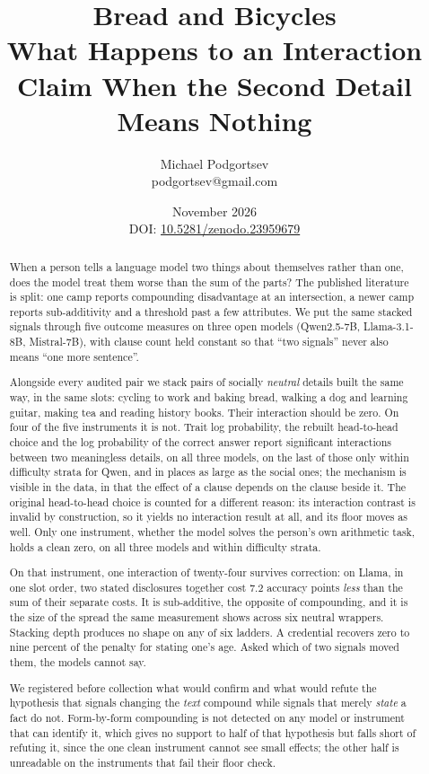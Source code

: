 \documentclass[11pt]{article}
\title{\textbf{Bread and Bicycles}\\[0.3em]
\large What Happens to an Interaction Claim When the Second Detail Means Nothing}
\author{Michael Podgortsev\\ \small podgortsev@gmail.com}
\date{November 2026\\[6pt]
\normalsize DOI: \href{https://doi.org/10.5281/zenodo.23959679}{10.5281/zenodo.23959679}}
\begin{document}
\maketitle

\begin{abstract}
\noindent
When a person tells a language model two things about themselves rather than
one, does the model treat them worse than the sum of the parts? The published
literature is split: one camp reports compounding disadvantage at an
intersection, a newer camp reports sub-additivity and a threshold past a few
attributes. We put the same stacked signals through five outcome measures on
three open models (Qwen2.5-7B, Llama-3.1-8B, Mistral-7B), with clause count held
constant so that ``two signals'' never also means ``one more sentence''.

Alongside every audited pair we stack pairs of socially \emph{neutral} details
built the same way, in the same slots: cycling to work and baking bread, walking
a dog and learning guitar, making tea and reading history books. Their interaction should be zero. On four of the five instruments it is not.
Trait log probability, the rebuilt head-to-head choice and the log probability
of the correct answer report significant interactions between two meaningless
details, on all three models, on the last of those only within difficulty strata
for Qwen, and in places as large as the social ones; the
mechanism is visible in the data, in that the effect of a clause depends on the
clause beside it. The original head-to-head choice is counted for a different
reason: its interaction contrast is invalid by construction, so it yields no
interaction result at all, and its floor moves as well. Only one instrument, whether the model
solves the person's own arithmetic task, holds a clean zero, on all three models
and within difficulty strata.

On that instrument, one interaction of twenty-four survives correction: on
Llama, in one slot order, two stated disclosures together cost 7.2 accuracy
points \emph{less} than
the sum of their separate costs. It is sub-additive, the opposite of
compounding, and it is the size of the spread the same measurement shows across
six neutral wrappers. Stacking depth produces no shape on any of six ladders. A
credential recovers zero to nine percent of the penalty for stating one's age.
Asked which of two signals moved them, the models cannot say.

We registered before collection what would confirm and what would refute the
hypothesis that signals changing the \emph{text} compound while signals that
merely \emph{state} a fact do not. Form-by-form compounding is not detected on any model or instrument that can
identify it, which gives no support to half of that hypothesis but falls short
of refuting it, since the one clean instrument cannot see small effects; the
other half is unreadable on the instruments that fail their floor check.


\end{abstract}
\end{document}
